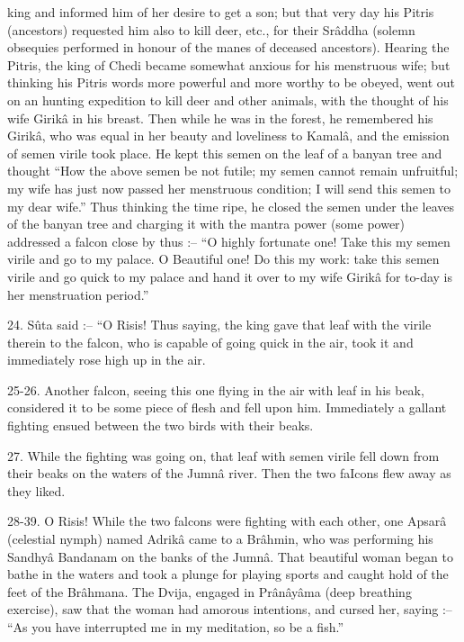  

king and informed him of her desire to get a son; but that very day his Pitris (ancestors) requested him also to kill deer, etc., for their Srâddha (solemn obsequies performed in honour of the manes of deceased ancestors). Hearing the Pitris, the king of Chedi became somewhat anxious for his menstruous wife; but thinking his Pitris words more powerful and more worthy to be obeyed, went out on an hunting expedition to kill deer and other animals, with the thought of his wife Girikâ in his breast. Then while he was in the forest, he remembered his Girikâ, who was equal in her beauty and loveliness to Kamalâ, and the emission of semen virile took place. He kept this semen on the leaf of a banyan tree and thought “How the above semen be not futile; my semen cannot remain unfruitful; my wife has just now passed her menstruous condition; I will send this semen to my dear wife.” Thus thinking the time ripe, he closed the semen under the leaves of the banyan tree and charging it with the mantra power (some power) addressed a falcon close by thus :-- “O highly fortunate one! Take this my semen virile and go to my palace. O Beautiful one! Do this my work: take this semen virile and go quick to my palace and hand it over to my wife Girikâ for to-day is her menstruation period.”

 

24. Sûta said :-- “O Risis! Thus saying, the king gave that leaf with the virile therein to the falcon, who is capable of going quick in the air, took it and immediately rose high up in the air.

 

25-26. Another falcon, seeing this one flying in the air with leaf in his beak, considered it to be some piece of flesh and fell upon him. Immediately a gallant fighting ensued between the two birds with their beaks.

 

27. While the fighting was going on, that leaf with semen virile fell down from their beaks on the waters of the Jumnâ river. Then the two faIcons flew away as they liked.

 

28-39. O Risis! While the two falcons were fighting with each other, one Apsarâ (celestial nymph) named Adrikâ came to a Brâhmin, who was performing his Sandhyâ Bandanam on the banks of the Jumnâ. That beautiful woman began to bathe in the waters and took a plunge for playing sports and caught hold of the feet of the Brâhmana. The Dvija, engaged in Prânâyâma (deep breathing exercise), saw that the woman had amorous intentions, and cursed her, saying :-- “As you have interrupted me in my meditation, so be a fish.”

